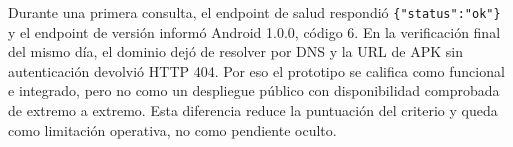 Durante una primera consulta, el endpoint de salud respondió
\texttt{\{"status":"ok"\}} y el endpoint de versión informó Android 1.0.0,
código 6. En la verificación final del mismo día, el dominio dejó de resolver
por DNS y la URL de APK sin autenticación devolvió HTTP 404. Por eso el
prototipo se califica como funcional e integrado, pero no como un despliegue
público con disponibilidad comprobada de extremo a extremo. Esta diferencia
reduce la puntuación del criterio y queda como limitación operativa, no como
pendiente oculto.
